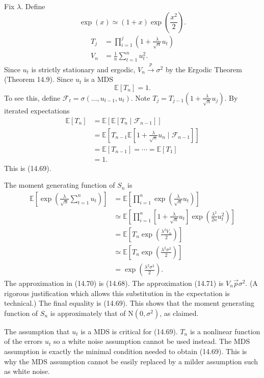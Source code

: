 \documentclass[10pt]{article}
\begin{document}
Fix $\lambda$. Define
$$
\exp (x) \simeq(1+x) \exp \left(\frac{x^{2}}{2}\right) .
$$
$$
\begin{aligned}
T_{j} &=\prod_{i=1}^{j}\left(1+\frac{\lambda}{\sqrt{n}} u_{t}\right) \\
V_{n} &=\frac{1}{n} \sum_{t=1}^{n} u_{t}^{2} .
\end{aligned}
$$
Since $u_{t}$ is strictly stationary and ergodic, $V_{n} \stackrel{p}{\rightarrow} \sigma^{2}$ by the Ergodic Theorem (Theorem 14.9). Since $u_{t}$ is a MDS
$$
\mathbb{E}\left[T_{n}\right]=1 .
$$
To see this, define $\mathscr{F}_{t}=\sigma\left(\ldots, u_{t-1}, u_{t}\right)$. Note $T_{j}=T_{j-1}\left(1+\frac{\lambda}{\sqrt{n}} u_{j}\right)$. By iterated expectations
$$
\begin{aligned}
\mathbb{E}\left[T_{n}\right] &=\mathbb{E}\left[\mathbb{E}\left[T_{n} \mid \mathscr{F}_{n-1}\right]\right] \\
&=\mathbb{E}\left[T_{n-1} \mathbb{E}\left[1+\frac{\lambda}{\sqrt{n}} u_{n} \mid \mathscr{F}_{n-1}\right]\right] \\
&=\mathbb{E}\left[T_{n-1}\right]=\cdots=\mathbb{E}\left[T_{1}\right] \\
&=1 .
\end{aligned}
$$
This is (14.69).

The moment generating function of $S_{n}$ is
$$
\begin{aligned}
\mathbb{E}\left[\exp \left(\frac{\lambda}{\sqrt{n}} \sum_{t=1}^{n} u_{t}\right)\right] &=\mathbb{E}\left[\prod_{i=1}^{n} \exp \left(\frac{\lambda}{\sqrt{n}} u_{t}\right)\right] \\
& \simeq \mathbb{E}\left[\prod_{i=1}^{n}\left[1+\frac{\lambda}{\sqrt{n}} u_{t}\right] \exp \left(\frac{\lambda^{2}}{2 n} u_{t}^{2}\right)\right] \\
&=\mathbb{E}\left[T_{n} \exp \left(\frac{\lambda^{2} V_{n}}{2}\right)\right] \\
& \simeq \mathbb{E}\left[T_{n} \exp \left(\frac{\lambda^{2} \sigma^{2}}{2}\right)\right] \\
&=\exp \left(\frac{\lambda^{2} \sigma^{2}}{2}\right) .
\end{aligned}
$$
The approximation in (14.70) is (14.68). The approximation (14.71) is $V_{n} \vec{p} \sigma^{2}$. (A rigorous justification which allows this substitution in the expectation is technical.) The final equality is (14.69). This shows that the moment generating function of $S_{n}$ is approximately that of $\mathrm{N}\left(0, \sigma^{2}\right)$, as claimed.

The assumption that $u_{t}$ is a MDS is critical for (14.69). $T_{n}$ is a nonlinear function of the errors $u_{t}$ so a white noise assumption cannot be used instead. The MDS assumption is exactly the minimal condition needed to obtain (14.69). This is why the MDS assumption cannot be easily replaced by a milder assumption such as white noise.
\end{document}
